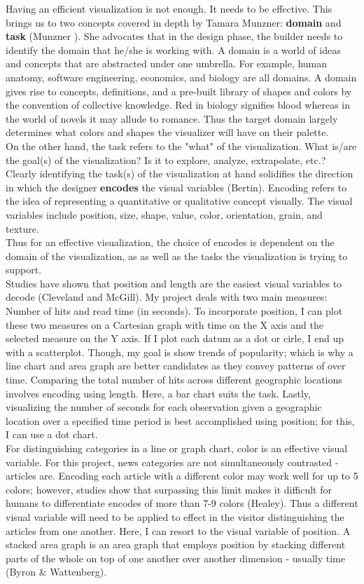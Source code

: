 \documentclass[12pt]{article}
\begin{document}
Having an efficient visualization is not enough. It needs to be effective. This brings us to two concepts covered in depth by Tamara Munzner: \textbf{domain} and \textbf{task} (Munzner \cite{munzner}). She advocates that in the design phase, the builder needs to identify the domain that he/she is working with. A domain is a world of ideas and concepts that are abstracted under one umbrella. For example, human anatomy, software engineering, economics, and biology are all domains. A domain gives rise to concepts, definitions, and a pre-built library of shapes and colors by the convention of collective knowledge. Red in biology signifies blood whereas in the world of novels it may allude to romance. Thus the target domain largely determines what colors and shapes the visualizer will have on their palette. \\
On the other hand, the task refers to the "what" of the visualization. What is/are the goal(s) of the visualization? Is it to explore, analyze, extrapolate, etc.? Clearly identifying the task(s) of the visualization at hand solidifies the direction in which the designer \textbf{encodes} the visual variables (Bertin). Encoding refers to the idea of representing a quantitative or qualitative concept visually. The visual variables include position, size, shape, value, color, orientation, grain, and texture. \\
Thus for an effective visualization, the choice of encodes is dependent on the domain of the visualization, as as well as the tasks the visualization is trying to support. \\
Studies have shown that position and length are the easiest visual variables to decode (Cleveland and McGill). My project deals with two main measures: Number of hits and read time (in seconds). To incorporate position, I can plot these two measures on a Cartesian graph with time on the X axis and the selected measure on the Y axis. If I plot each datum as a dot or cirle, I end up with a scatterplot. Though, my goal is show trends of popularity; which is why a line chart and area graph are better candidates as they convey patterns of over time. Comparing the total number of hits across different geographic locations involves encoding using length. Here, a bar chart suits the task. Lastly, visualizing the number of seconds for each observation given a geographic location over a specified time period is best accomplished using position; for this, I can use a dot chart. \\
For distinguishing categories in a line or graph chart, color is an effective visual variable. For this project, news categories are not simultaneously contrasted - articles are. Encoding each article with a different color may work well for up to 5 colors; however, studies show that surpassing this limit makes it difficult for humans to differentiate encodes of more than 7-9 colors (Healey). Thus a different visual variable will need to be applied to effect in the visitor distinguishing the articles from one another. Here, I can resort to the visual variable of position. A stacked area graph is an area graph that employs position by stacking different parts of the whole on top of one another over another dimension - usually time (Byron \& Wattenberg).  
\end{document}
